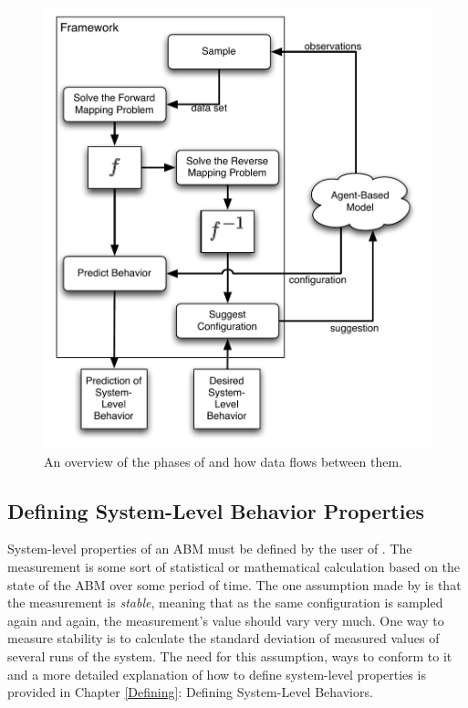 \begin{figure}[H]
\centering
\includegraphics[scale=1]{images/framework.pdf}
\caption{An overview of the phases of \fw and how data flows between them.}
\label{fig:frameworkdiag}
\end{figure}

\subsection{Defining System-Level Behavior Properties}
System-level properties of an ABM must be defined by the user of \fw.
The measurement is some sort of statistical or mathematical calculation based on the state of the ABM over some period of time.
The one assumption made by \fw is that the measurement is \textit{stable}, meaning that as the same configuration is sampled again and again, the measurement's value should vary very much.
One way to measure stability is to calculate the standard deviation of measured values of several runs of the system.
The need for this assumption, ways to conform to it and a more detailed explanation of how to define system-level properties is provided in Chapter \ref{Defining}: Defining System-Level Behaviors.

